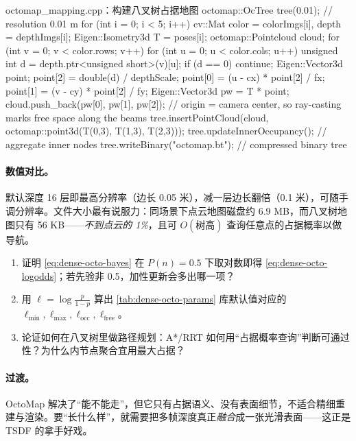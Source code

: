 \begin{codebox}[C++]{octomap\_mapping.cpp：构建八叉树占据地图}
octomap::OcTree tree(0.01);     // resolution 0.01 m
for (int i = 0; i < 5; i++) {
  cv::Mat color = colorImgs[i], depth = depthImgs[i];
  Eigen::Isometry3d T = poses[i];
  octomap::Pointcloud cloud;
  for (int v = 0; v < color.rows; v++)
  for (int u = 0; u < color.cols; u++) {
    unsigned int d = depth.ptr<unsigned short>(v)[u];
    if (d == 0) continue;
    Eigen::Vector3d point;
    point[2] = double(d) / depthScale;
    point[0] = (u - cx) * point[2] / fx;
    point[1] = (v - cy) * point[2] / fy;
    Eigen::Vector3d pw = T * point;
    cloud.push_back(pw[0], pw[1], pw[2]);
  }
  // origin = camera center, so ray-casting marks free space along the beams
  tree.insertPointCloud(cloud, octomap::point3d(T(0,3), T(1,3), T(2,3)));
}
tree.updateInnerOccupancy();    // aggregate inner nodes
tree.writeBinary("octomap.bt"); // compressed binary tree
\end{codebox}

\paragraph{数值对比。}
默认深度 16 层即最高分辨率（边长 0.05 米），减一层边长翻倍（0.1 米），可随手调分辨率。文件大小最有说服力：同场景下点云地图磁盘约 6.9 MB，而八叉树地图只有 56 KB——\emph{不到点云的 1\%}\cite{gaoxiang2019slam14}，且可 $O(\text{树高})$ 查询任意点的占据概率以做导航。

\begin{practice}[练习]
\begin{enumerate}
  \item 证明 \cref{eq:dense-octo-bayes} 在 $P(n)=0.5$ 下取对数即得 \cref{eq:dense-octo-logodds}；若先验非 0.5，加性更新会多出哪一项？
  \item 用 $\ell=\log\frac{p}{1-p}$ 算出 \cref{tab:dense-octo-params} 库默认值对应的 $\ell_{\min},\ell_{\max},\ell_{\mathrm{occ}},\ell_{\mathrm{free}}$。
  \item 论证如何在八叉树里做路径规划：A*/RRT 如何用“占据概率查询”判断可通过性？为什么内节点聚合宜用最大占据？
\end{enumerate}
\end{practice}

\paragraph{过渡。}
OctoMap 解决了“能不能走”，但它只有占据语义、没有表面细节，不适合精细重建与渲染。要“长什么样”，就需要把多帧深度真正\emph{融合}成一张光滑表面——这正是 TSDF 的拿手好戏。


